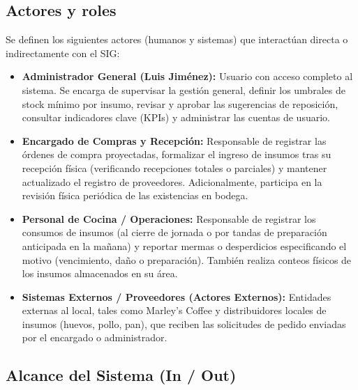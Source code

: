 \documentclass[11pt,letterpaper]{article}
\begin{document}
\subsection{Actores y roles}
Se definen los siguientes actores (humanos y sistemas) que interactúan directa o indirectamente con el SIG:

\begin{itemize}
    \item \textbf{Administrador General (Luis Jiménez):} Usuario con acceso completo al sistema. Se encarga de supervisar la gestión general, definir los umbrales de stock mínimo por insumo, revisar y aprobar las sugerencias de reposición, consultar indicadores clave (KPIs) y administrar las cuentas de usuario.
    \item \textbf{Encargado de Compras y Recepción:} Responsable de registrar las órdenes de compra proyectadas, formalizar el ingreso de insumos tras su recepción física (verificando recepciones totales o parciales) y mantener actualizado el registro de proveedores. Adicionalmente, participa en la revisión física periódica de las existencias en bodega.
    \item \textbf{Personal de Cocina / Operaciones:} Responsable de registrar los consumos de insumos (al cierre de jornada o por tandas de preparación anticipada en la mañana) y reportar mermas o desperdicios especificando el motivo (vencimiento, daño o preparación). También realiza conteos físicos de los insumos almacenados en su área.
    \item \textbf{Sistemas Externos / Proveedores (Actores Externos):} Entidades externas al local, tales como Marley's Coffee y distribuidores locales de insumos (huevos, pollo, pan), que reciben las solicitudes de pedido enviadas por el encargado o administrador.
\end{itemize}

\subsection{Alcance del Sistema (In / Out)}
\end{document}
